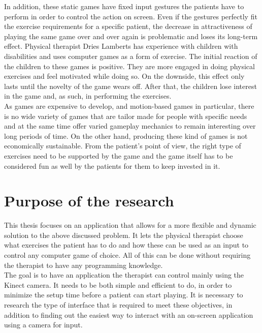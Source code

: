 In addition, these static games have fixed input gestures the patients have to perform in order to control the action on screen. Even if the gestures perfectly fit the exercise requirements for a specific patient, the decrease in attractiveness of playing the same game over and over again is problematic and loses its long-term effect. Physical therapist Dries Lamberts has experience with children with disabilities and uses computer games as a form of exercise. The initial reaction of the children to these games is positive. They are more engaged in doing physical exercises and feel motivated while doing so. On the downside, this effect only lasts until the novelty of the game wears off. After that, the children lose interest in the game and, as such, in performing the exercises.\\

As games are expensive to develop, and motion-based games in particular, there is no wide variety of games that are tailor made for people with specific needs and at the same time offer varied gameplay mechanics to remain interesting over long periods of time. On the other hand, producing these kind of games is not economically sustainable. From the patient's point of view, the right type of exercises need to be supported by the game and the game itself has to be considered fun as well by the patients for them to keep invested in it.\\


\section{Purpose of the research}

This thesis focuses on an application that allows for a more flexible and dynamic solution to the above discussed problem. It lets the physical therapist choose what exercises the patient has to do and how these can be used as an input to control any computer game of choice. All of this can be done without requiring the therapist to have any programming knowledge.\\

The goal is to have an application the therapist can control mainly using the Kinect camera. It needs to be both simple and efficient to do, in order to minimize the setup time before a patient can start playing. It is necessary to research the type of interface that is required to meet these objectives, in addition to finding out the easiest way to interact with an on-screen application using a camera for input.